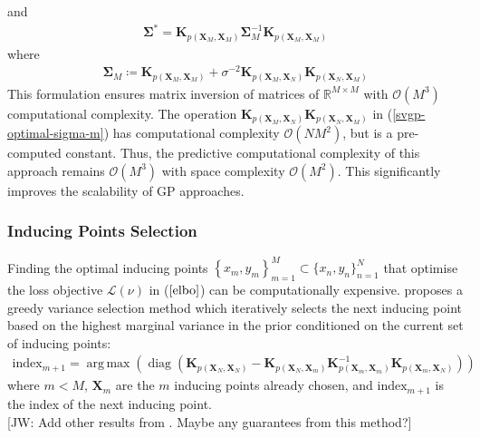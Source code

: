 \documentclass{article}
\newcommand{\jw}[1]{{\color{gray} [JW: #1]}}
\newcommand{\diag}{\operatorname{diag}}
\DeclareMathOperator*{\argmax}{arg\,max}
\numberwithin{equation}{section}
\begin{document}
and
\begin{align}
    \label{svgp-optimal-covariance}
    \mathbf{\Sigma}^* = \mathbf{K}_{p(\mathbf{X}_M, \mathbf{X}_M)} \mathbf{\Sigma}_M^{-1}\mathbf{K}_{p(\mathbf{X}_M, \mathbf{X}_M)}
\end{align}
where 
\begin{align}
    \mathbf{\Sigma}_M \coloneqq \mathbf{K}_{p(\mathbf{X}_M, \mathbf{X}_M)} + \sigma^{-2}\mathbf{K}_{p(\mathbf{X}_M, \mathbf{X}_N)}\mathbf{K}_{p(\mathbf{X}_N, \mathbf{X}_M)}
    \label{svgp-optimal-sigma-m}
\end{align}
This formulation ensures matrix inversion of matrices of $\mathbb{R}^{M \times M}$ with $\mathcal{O}\left(M^3\right)$ computational complexity. The operation $\mathbf{K}_{p(\mathbf{X}_M, \mathbf{X}_N)}\mathbf{K}_{p(\mathbf{X}_N, \mathbf{X}_M)}$ in (\ref{svgp-optimal-sigma-m}) has computational complexity $\mathcal{O}\left(NM^2\right)$, but is a pre-computed constant. Thus, the predictive computational complexity of this approach remains $\mathcal{O}\left(M^3\right)$ with space complexity $\mathcal{O}\left(M^2\right)$. This significantly improves the scalability of GP approaches.

\subsubsection{Inducing Points Selection}
Finding the optimal inducing points $\left\{x_m, y_m\right\}_{m=1}^{M} \subset \{x_n, y_n\}_{n=1}^{N}$ that optimise the loss objective $\mathcal{L}(\nu)$ in ($\ref{elbo}$) can be computationally expensive. \cite{burt2020convergence} proposes a greedy variance selection method which iteratively selects the next inducing point based on the highest marginal variance in the prior conditioned on the current set of inducing points:
\begin{align}
    \label{greedy-varaince-selection}
    \text{index}_{m+1} = \argmax \left(\diag \left(\mathbf{K}_{p(\mathbf{X}_N, \mathbf{X}_N)} - \mathbf{K}_{p(\mathbf{X}_N, \mathbf{X}_{m})} \mathbf{K}_{p(\mathbf{X}_{m}, \mathbf{X}_{m})}^{-1}\mathbf{K}_{p(\mathbf{X}_{m}, \mathbf{X}_N)}\right)\right)
\end{align}
where $m < M$, $\mathbf{X}_{m}$ are the $m$ inducing points already chosen, and $\text{index}_{m+1}$ is the index of the next inducing point.
\\\jw{Add other results from \cite{burt2020convergence}. Maybe any guarantees from this method?}
\end{document}
